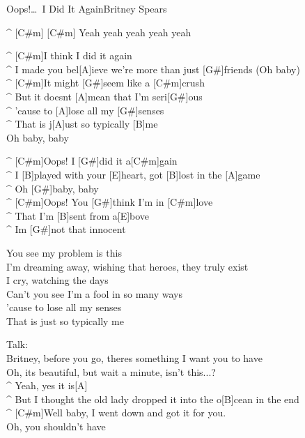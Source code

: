 \begin{song}{Oops!\dots\ I Did It Again}{Britney Spears}

\begin{guitar}
^ [C#m]    [C#m]   Yeah yeah yeah yeah yeah\\
\end{guitar}

\begin{guitar}
^ [C#m]I think I did it again\\
^ I made you bel[A]ieve we're more than just [G#]friends (Oh baby)\\
^ [C#m]It might [G#]seem like a [C#m]crush\\
^ But it doesnt [A]mean that I'm seri[G#]ous\\
^ 'cause to [A]lose all my [G#]senses\\
^ That is j[A]ust so typically [B]me\\
Oh baby, baby\\
\end{guitar}

\begin{guitar}
^ [C#m]Oops! I [G#]did it a[C#m]gain\\
^ I [B]played with your [E]heart, got [B]lost in the [A]game\\
^ Oh [G#]baby, baby\\
^ [C#m]Oops! You [G#]think I'm in [C#m]love\\
^ That I'm [B]sent from a[E]bove\\
^ Im [G#]not that innocent\\
\end{guitar}

\begin{guitar}
You see my problem is this\\
I'm dreaming away, wishing that heroes, they truly exist\\
I cry, watching the days\\
Can't you see I'm a fool in so many ways\\
'cause to lose all my senses\\
That is just so typically me\\
\end{guitar}


\begin{guitar}
Talk:\\
Britney, before you go, theres something I want you to have\\
Oh, its beautiful, but wait a minute, isn't this...? \\
^ Yeah, yes it is[A]\\
^ But I thought the old lady dropped it into the o[B]cean in the end\\
^ [C#m]Well baby, I went down and got it for you.\\
Oh, you shouldn't have\\
\end{guitar}


\end{song}
